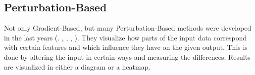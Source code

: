 \subsection{Perturbation-Based}
Not only Gradient-Based, but many Perturbation-Based methods were developed in the last years (\cite{AmitDhurandhar.2018}. \cite{Ribeiro.2018}, \cite{Luss.}, \cite{Kim.2018}, \cite{Zintgraf.2017}). They visualize how parts of the input data correspond with certain features and which influence they have on the given output. This is done by altering the input in certain ways and measuring the differences. Results are visualized in either a diagram or a heatmap.